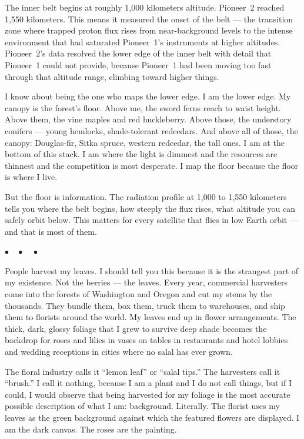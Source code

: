 \documentclass[12pt, letterpaper]{article}
\begin{document}
The inner belt begins at roughly 1,000 kilometers altitude. Pioneer~2 reached 1,550 kilometers. This means it measured the onset of the belt --- the transition zone where trapped proton flux rises from near-background levels to the intense environment that had saturated Pioneer~1's instruments at higher altitudes. Pioneer~2's data resolved the lower edge of the inner belt with detail that Pioneer~1 could not provide, because Pioneer~1 had been moving too fast through that altitude range, climbing toward higher things.

I know about being the one who maps the lower edge. I am the lower edge. My canopy is the forest's floor. Above me, the sword ferns reach to waist height. Above them, the vine maples and red huckleberry. Above those, the understory conifers --- young hemlocks, shade-tolerant redcedars. And above all of those, the canopy: Douglas-fir, Sitka spruce, western redcedar, the tall ones. I am at the bottom of this stack. I am where the light is dimmest and the resources are thinnest and the competition is most desperate. I map the floor because the floor is where I live.

But the floor is information. The radiation profile at 1,000 to 1,550 kilometers tells you where the belt begins, how steeply the flux rises, what altitude you can safely orbit below. This matters for every satellite that flies in low Earth orbit --- and that is most of them.

\begin{center}
$\bullet\quad\bullet\quad\bullet$
\end{center}

People harvest my leaves. I should tell you this because it is the strangest part of my existence. Not the berries --- the leaves. Every year, commercial harvesters come into the forests of Washington and Oregon and cut my stems by the thousands. They bundle them, box them, truck them to warehouses, and ship them to florists around the world. My leaves end up in flower arrangements. The thick, dark, glossy foliage that I grew to survive deep shade becomes the backdrop for roses and lilies in vases on tables in restaurants and hotel lobbies and wedding receptions in cities where no salal has ever grown.

The floral industry calls it ``lemon leaf'' or ``salal tips.'' The harvesters call it ``brush.'' I call it nothing, because I am a plant and I do not call things, but if I could, I would observe that being harvested for my foliage is the most accurate possible description of what I am: background. Literally. The florist uses my leaves as the green background against which the featured flowers are displayed. I am the dark canvas. The roses are the painting.
\end{document}
